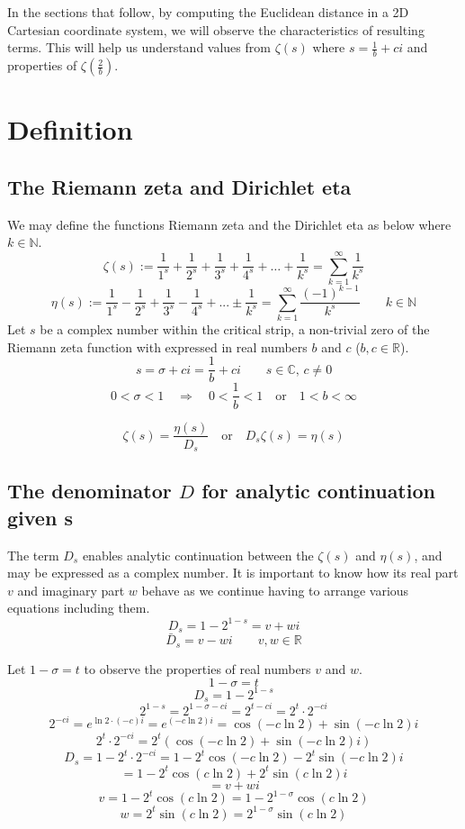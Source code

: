 \documentclass{amsart}
\begin{document}
	In the sections that follow, by computing the Euclidean distance in a 2D Cartesian coordinate system, we will observe the characteristics of resulting terms. This will help us understand values from $\zeta(s)$ where $s = \frac{1}{b} + ci$ and properties of $\zeta(\frac{2}{b})$.
	\[\]
	
	\section{Definition}
	\subsection{The Riemann zeta and Dirichlet eta}
	We may define the functions Riemann zeta and the Dirichlet eta as below where $ k \in \mathbb{N} $.
	\[ \zeta(s) := \frac{1}{1^s} + \frac{1}{2^s} + \frac{1}{3^s} + \frac{1}{4^s} + {\dots} + \frac{1}{k^s} = \sum\limits_{k=1}^{\infty}\frac{1}{k^s} \]
	\[ \eta(s) := \frac{1}{1^s} - \frac{1}{2^s} + \frac{1}{3^s} - \frac{1}{4^s} + ... \pm \frac{1}{k^s} = \sum\limits_{k=1}^{\infty}\frac{(-1)^{k-1}}{k^s} \qquad k \in \mathbb{N} \]
	Let $s$ be a complex number within the critical strip, a non-trivial zero of the Riemann zeta function with expressed in real numbers $b$ and $c$  ($b,c \in \mathbb{R}$).
	\[ s = \sigma + ci = \frac{1}{b} + ci \qquad s \in \mathbb{C}, \, c \neq 0 \]
	\[ 0 < \sigma < 1 \quad \Rightarrow \quad 0 < \frac{1}{b} < 1 \quad \text{or} \quad 1<b<\infty \]
	
	
	\[ \zeta(s) = \frac{\eta(s)}{D_s} \quad \text{or} \quad D_s\zeta(s) = \eta(s) \]
	\subsection{The denominator $D$ for analytic continuation given s}
	The term $D_s$ enables analytic continuation between the $\zeta(s)$ and $\eta(s)$, and may be expressed as a complex number. It is important to know how its real part $v$ and imaginary part $w$ behave as we continue having to arrange various equations including them.
	\[ D_{s} = 1-2^{1-s} = v + wi \]
	\[ \bar{D}_{s} = v - wi  \qquad v,w \in \mathbb{R} \]
	
	Let $1 - \sigma = t$ to observe the properties of real numbers $v$ and $w$.
	\[ 1 - \sigma = t \]
	\[ D_{s} = 1-2^{1-s} \]
	\[ 2^{1-s} = 2^{1-\sigma - ci} = 2^{t-ci} = 2^t \cdot 2^{-ci} \]
	\[ 2^{-ci} = e^{\ln2 \cdot (-c)i} = e^{(-c \ln 2) i} = \cos(-c \ln 2) + \sin(-c \ln 2)i \]
	\[ 2^t \cdot 2^{-ci} = 2^t(\cos(-c \ln 2) + \sin(-c \ln 2)i) \]
	\[ D_{s} = 1-2^t \cdot 2^{-ci} = 1 - 2^t\cos(-c \ln 2) - 2^t\sin(-c \ln 2)i \]
	\[ = 1 - 2^t\cos(c \ln 2) + 2^t\sin(c \ln 2)i \]
	\[ = v + wi \]
	\[ v = 1 - 2^t\cos(c \ln 2) = 1 - 2^{1-\sigma}\cos(c \ln 2) \]
	\[ w = 2^t\sin(c \ln 2) = 2^{1-\sigma}\sin(c \ln 2) \]
	\[\]
	
\end{document}
